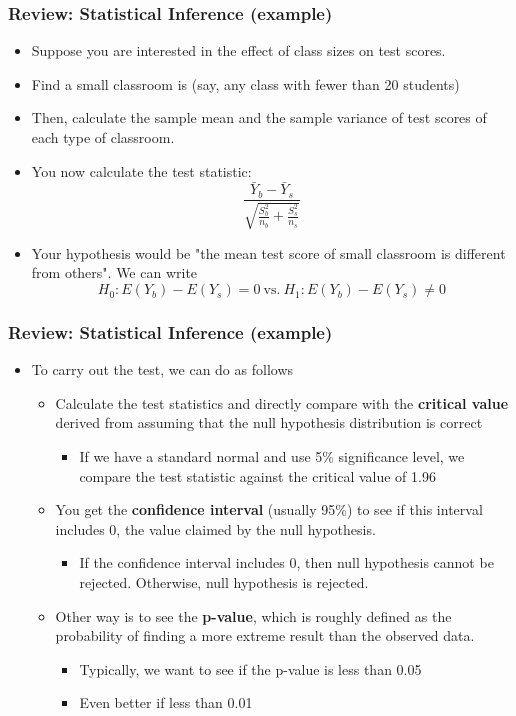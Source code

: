 \documentclass[compress]{beamer}
\begin{document}
\begin{frame}
\frametitle{Review: Statistical Inference (example)}
\begin{itemize}
\item Suppose you are interested in the effect of class sizes on test scores. 
\item Find a small classroom is (say, any class with fewer than 20 students) 
\item Then, calculate the sample mean and the sample variance of test scores of each type of classroom. 
\item You now calculate the test statistic: 
\[ 
\frac{\bar{Y}_b-\bar{Y}_s}{\sqrt{\frac{S_b^2}{n_b}+\frac{S_s^2}{n_s}}}
\]
\item Your hypothesis would be "the mean test score of small classroom is different from others". We can write
\[
H_0: E(Y_b)-E(Y_s) = 0\ \text{vs.}\ H_1:E(Y_b)-E(Y_s) \neq 0
\]
\end{itemize}
\end{frame}

\begin{frame}
\frametitle{Review: Statistical Inference (example)}
\begin{itemize}
\item To carry out the test, we can do as follows
\begin{itemize}
\item Calculate the test statistics and directly compare with the \textbf{critical value} derived from assuming that the null hypothesis distribution is correct
\begin{itemize}
\item If we have a standard normal and use 5\% significance level, we compare the test statistic against the critical value of 1.96
\end{itemize}
\item You get the \textbf{confidence interval} (usually 95\%) to see if this interval includes 0, the value claimed by the null hypothesis. 
\begin{itemize}
\item If the confidence interval includes 0, then null hypothesis cannot be rejected. Otherwise, null hypothesis is rejected.
\end{itemize}
\item Other way is to see the \textbf{p-value}, which is roughly defined as the probability of finding a more extreme result than the observed data.
\begin{itemize}
\item Typically, we want to see if the p-value is less than 0.05 
\item Even better if less than 0.01
\end{itemize}
\end{itemize}
\end{itemize}
\end{frame}
\end{document}
